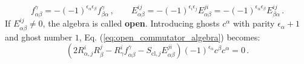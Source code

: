 \begin{equation} \label{eq:open_algebra_tensor_symmetries}
    f^\gamma_{\alpha\beta} = -(-1)^{\epsilon_\alpha \epsilon_\beta} f^\gamma_{\beta\alpha} \, , \qquad E^{ij}_{\alpha\beta} = -(-1)^{\epsilon_i \epsilon_j} E^{ji}_{\alpha\beta} = -(-1)^{\epsilon_\alpha \epsilon_\beta} E^{ij}_{\beta\alpha} \, .
\end{equation}
If \(E^{ij}_{\alpha\beta} \neq 0\), the algebra is called \textbf{open}. Introducing ghosts \(c^\alpha\) with parity \(\epsilon_\alpha + 1\) and ghost number \(1\), Eq. (\ref{eq:open_commutator_algebra}) becomes:
\begin{equation} \label{eq:open_algebra_ghost_form}
    \left( 2 R^i_{\alpha, j} R^j_\beta - R^i_\gamma f^\gamma_{\alpha\beta} - S_{\text{cl}, j} E^{ji}_{\alpha\beta} \right) (-1)^{\epsilon_\alpha} c^\beta c^\alpha = 0 \, .
\end{equation}

